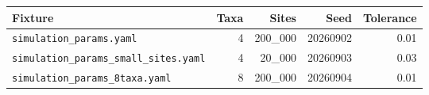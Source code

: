 \begin{tabular}{lrrrr}
  \toprule
  Fixture & Taxa & Sites & Seed & Tolerance \\
  \midrule
  \texttt{simulation\_params.yaml} & 4 & 200\_000 & 20260902 & 0.01 \\
  \texttt{simulation\_params\_small\_sites.yaml} & 4 & 20\_000 & 20260903 & 0.03 \\
  \texttt{simulation\_params\_8taxa.yaml} & 8 & 200\_000 & 20260904 & 0.01 \\
  \bottomrule
\end{tabular}
